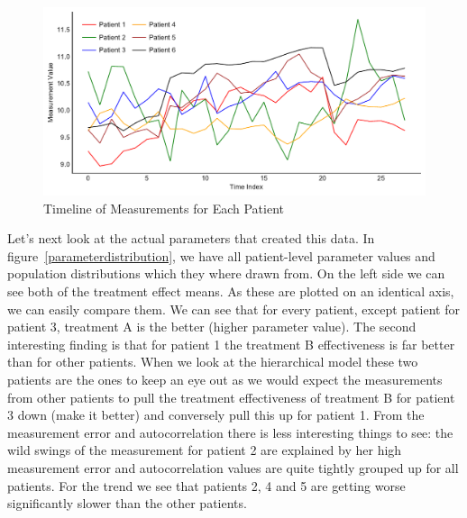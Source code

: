 \documentclass[12pt,a4paper,leqno]{report}
\theoremstyle{plain}
\theoremstyle{definition}
\theoremstyle{remark}
\begin{document}
\begin{figure}[H]
    \caption{Timeline of Measurements for Each Patient}
    \label{measurementtimeline}
    \includegraphics[width=\textwidth,height=\textheight,keepaspectratio]{measurements_timeline.pdf}
\end{figure}

Let's next look at the actual parameters that created this data. In figure\
\ref{parameterdistribution}, we have all patient-level parameter values and population
distributions which they where drawn from. On the left side we can see both of the
treatment effect means. As these are plotted on an identical axis, we can easily compare
them. We can see that for every patient, except patient for patient 3, treatment A is
the better (higher parameter value). The second interesting finding is that for patient
1 the treatment B effectiveness is far better than for other patients. When we look at
the hierarchical model these two patients are the ones to keep an eye out as we would
expect the measurements from other patients to pull the treatment effectiveness of
treatment B for patient 3 down (make it better) and conversely pull this up for patient 1. From the measurement error and autocorrelation
there is less interesting things to see: the wild swings of the measurement for patient 2
are explained by her high measurement error and autocorrelation values are quite tightly
grouped up for all patients. For the trend we see that patients 2, 4 and 5 are getting
worse significantly slower than the other patients.
\end{document}
